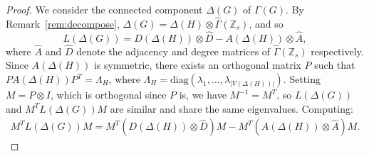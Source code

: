 \documentclass[11pt]{article}
\begin{document}
    \begin{proof}
        We consider the connected component $\Delta(G)$ of $\Gamma(G)$. By 
     Remark~\ref{rem:decompose}, $\Delta(G) = \Delta(H)\otimes\widehat{
        \Gamma}(\mathbb{Z}_s)$, and so
        $$L(\Delta(G)) = D(\Delta(H))\otimes\widehat{D} - A(\Delta(H))
        \otimes\widehat{A},$$
        where $\widehat{A}$ and $\widehat{D}$ denote the adjacency and degree 
        matrices of $\widehat{\Gamma}(\mathbb{Z}_s)$ respectively. Since 
        $A(\Delta(H))$ is symmetric, there exists an orthogonal matrix $P$ 
        such that $PA(\Delta(H))P^T = \Lambda_H$, where $\Lambda_H = 
        \mathrm{diag}(\lambda_1,\ldots,\lambda_{|V(\Delta(H))|})$. Setting 
        $M = P\otimes I$, which is orthogonal since $P$ is, we have $M^{-1} 
        = M^T$, so $L(\Delta(G))$ and $M^TL(\Delta(G))M$ are similar and 
        share the same eigenvalues. Computing:
        \begin{align}\label{eq:abbound}
        M^TL(\Delta(G))M = M^T(D(\Delta(H))\otimes\widehat{D})M - 
        M^T(A(\Delta(H))\otimes\widehat{A})M.
        \end{align}
    

\end{proof}
\end{document}
